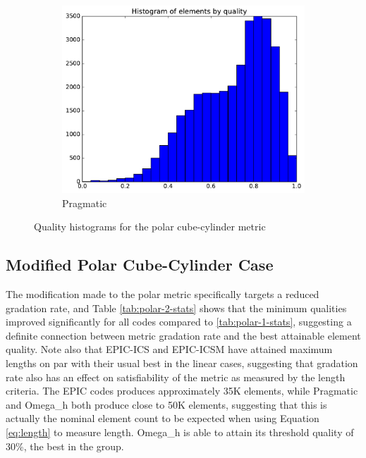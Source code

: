 \documentclass[3p,times,procedia,number]{elsarticle}
\begin{document}
\begin{figure}
\begin{subfigure}{.24\textwidth}
\includegraphics[width=\textwidth]{pragmatic-cube-cylinder-polar-1-quality.pdf}
\caption{Pragmatic}
\end{subfigure}
\caption{Quality histograms for the polar cube-cylinder metric}
\label{fig:cube-cylinder-polar-1-qualities}
\end{figure}

\subsection{Modified Polar Cube-Cylinder Case}

The modification made to the polar metric specifically targets
a reduced gradation rate, and Table \ref{tab:polar-2-stats}
shows that the minimum qualities improved significantly for all
codes compared to \ref{tab:polar-1-stats}, suggesting a definite
connection between metric gradation rate and the best attainable
element quality.
Note also that EPIC-ICS and EPIC-ICSM have attained maximum lengths
on par with their usual best in the linear cases, suggesting that
gradation rate also has an effect on satisfiability of the metric
as measured by the length criteria.
The EPIC codes produces approximately 35K elements, while
Pragmatic and Omega\_h both produce close to 50K elements,
suggesting that this is actually the nominal element count
to be expected when using Equation \ref{eq:length} to measure length.
Omega\_h is able to attain its threshold quality of 30\%, the best in the group.
\end{document}
